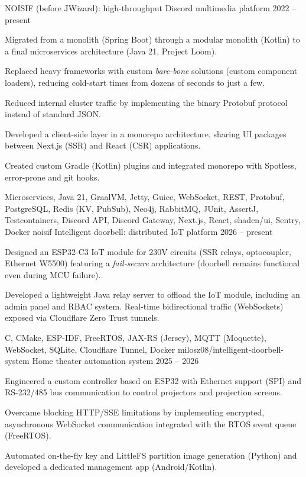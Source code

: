 \newcommand{\ProjectsTitle}{Selected projects}
\renewcommand{\ProjectsList}{}
\AddProjectEntry
  {NOISIF (before JWizard): high-throughput Discord multimedia platform}
  {2022 -- present}
  {%
    \item
      Migrated from a monolith (Spring Boot) through a modular monolith (Kotlin) to a final microservices architecture
      (Java 21, Project Loom).
    \item
      Replaced heavy frameworks with custom \textit{bare-bone} solutions (custom component loaders), reducing cold-start
      times from dozens of seconds to just a few.
    \item
      Reduced internal cluster traffic by implementing the binary Protobuf protocol instead of standard JSON.
    \item
      Developed a client-side layer in a monorepo architecture, sharing UI packages between Next.js (SSR) and React
      (CSR) applications.
    \item
      Created custom Gradle (Kotlin) plugins and integrated monorepo with Spotless, error-prone and git hooks.
  }
  {%
    Microservices, Java 21, GraalVM, Jetty, Guice, WebSocket, REST, Protobuf, PostgreSQL, Redis (KV, PubSub), Neo4j,
    RabbitMQ, JUnit, AssertJ, Testcontainers, Discord API, Discord Gateway, Next.js, React, shadcn/ui, Sentry, Docker
  }
  {noisif}
\AddProjectEntry
  {Intelligent doorbell: distributed IoT platform}
  {2026 -- present}
  {%
    \item
      Designed an ESP32-C3 IoT module for 230V circuits (SSR relays, optocoupler, Ethernet W5500) featuring a
      \textit{fail-secure} architecture (doorbell remains functional even during MCU failure).
    \item
      Developed a lightweight Java relay server to offload the IoT module, including an admin panel and RBAC system.
      Real-time bidirectional traffic (WebSockets) exposed via Cloudflare Zero Trust tunnels.
  }
  {C, CMake, ESP-IDF, FreeRTOS, JAX-RS (Jersey), MQTT (Moquette), WebSocket, SQLite, Cloudflare Tunnel, Docker}
  {milosz08/intelligent-doorbell-system}
\AddProjectEntry
  {Home theater automation system}
  {2025 -- 2026}
  {%
    \item
      Engineered a custom controller based on ESP32 with Ethernet support (SPI) and RS-232/485 bus communication to
      control projectors and projection screens.
    \item
      Overcame blocking HTTP/SSE limitations by implementing encrypted, asynchronous WebSocket communication integrated
      with the RTOS event queue (FreeRTOS).
    \item
      Automated on-the-fly key and LittleFS partition image generation (Python) and developed a dedicated management app
      (Android/Kotlin).
  }
